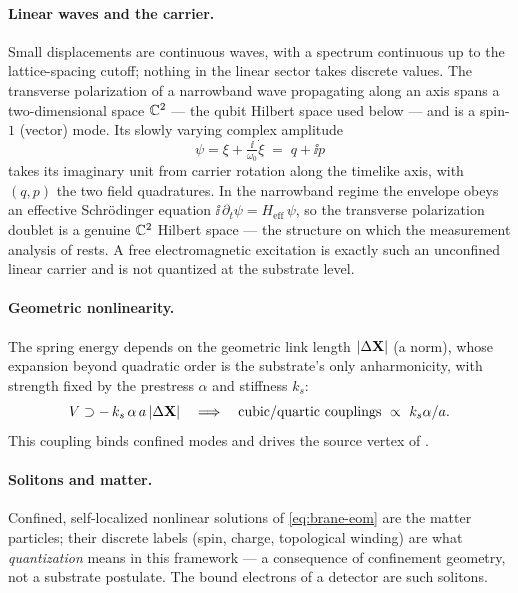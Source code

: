 \paragraph{Linear waves and the carrier.}
Small displacements are continuous waves, with a spectrum continuous up to the lattice-spacing
cutoff; nothing in the linear sector takes discrete values. The transverse polarization of a
narrowband wave propagating along an axis spans a two-dimensional space $\mathbb{C}^{2}$ --- the qubit
Hilbert space used below --- and is a spin-$1$ (vector) mode. Its slowly varying complex amplitude
\begin{equation}
  \psi=\xi+\tfrac{\ii}{\omega_0}\dot\xi \;=\; q+\ii p
  \label{eq:carrier}
\end{equation}
takes its imaginary unit from carrier rotation along the timelike axis, with $(q,p)$ the two field
quadratures. In the narrowband regime the envelope obeys an effective Schr\"odinger equation
$\ii\,\partial_t\psi=H_{\mathrm{eff}}\,\psi$, so the transverse polarization doublet is a genuine
$\mathbb{C}^{2}$ Hilbert space --- the structure on which the measurement analysis of 
rests. A free electromagnetic excitation is exactly such an unconfined linear carrier and is not
quantized at the substrate level.

\paragraph{Geometric nonlinearity.}
The spring energy depends on the geometric link length $|\Delta\mathbf{X}|$ (a norm), whose expansion
beyond quadratic order is the substrate's only anharmonicity, with strength fixed by the prestress
$\alpha$ and stiffness $k_s$:
\begin{equation}
  V\supset -\,k_s\,\alpha\,a\,|\Delta\mathbf{X}|
  \quad\Longrightarrow\quad
  \text{cubic/quartic couplings}\ \propto\ k_s\alpha/a .
  \label{eq:geom-nonlinear}
\end{equation}
This coupling binds confined modes and drives the source vertex of .

\paragraph{Solitons and matter.}
Confined, self-localized nonlinear solutions of \eqref{eq:brane-eom} are the matter particles;
their discrete labels (spin, charge, topological winding) are what \emph{quantization} means in
this framework --- a consequence of confinement geometry, not a substrate postulate. The bound
electrons of a detector are such solitons.

